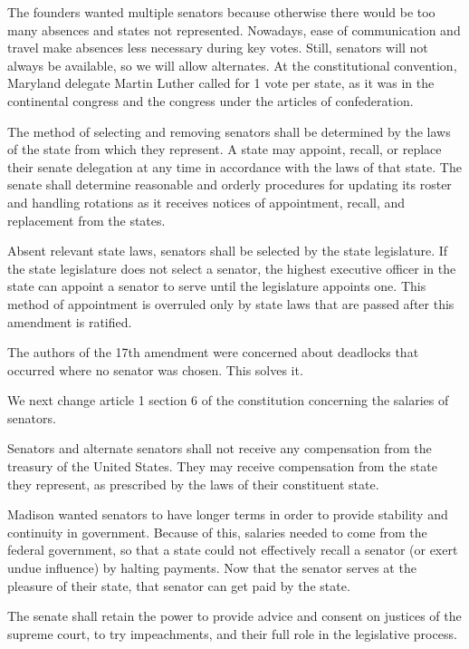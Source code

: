 \documentclass{article}
\begin{document}
The founders wanted multiple senators because otherwise there would be too many absences and states not represented. Nowadays, ease of communication and travel make absences less necessary during key votes. Still, senators will not always be available, so we will allow alternates. At the constitutional convention, Maryland delegate Martin Luther called for 1 vote per state, as it was in the continental congress and the congress under the articles of confederation\cite{Senate}.

\begin{quoting}
The method of selecting and removing senators shall be determined by the laws of the state from which they represent. A state may appoint, recall, or replace their senate delegation at any time in accordance with the laws of that state. The senate shall determine reasonable and orderly procedures for updating its roster and handling rotations as it receives notices of appointment, recall, and replacement from the states.

Absent relevant state laws, senators shall be selected by the state legislature. If the state legislature does not select a senator, the highest executive officer in the state can appoint a senator to serve until the legislature appoints one. This method of appointment is overruled only by state laws that are passed after this amendment is ratified.
\end{quoting}

The authors of the 17th amendment were concerned about deadlocks that occurred where no senator was chosen. This solves it.

We next change article 1 section 6 of the constitution concerning the salaries of senators.

\begin{quoting}
Senators and alternate senators shall not receive any compensation from the treasury of the United States. They may receive compensation from the state they represent, as prescribed by the laws of their constituent state.
\end{quoting}

Madison wanted senators to have longer terms in order to provide stability and continuity in government. Because of this, salaries needed to come from the federal government, so that a state could not effectively recall a senator (or exert undue influence) by halting payments. Now that the senator serves at the pleasure of their state, that senator can get paid by the state.

\begin{quoting}
The senate shall retain the power to provide advice and consent on justices of the supreme court, to try impeachments, and their full role in the legislative process.
\end{quoting}
\end{document}
